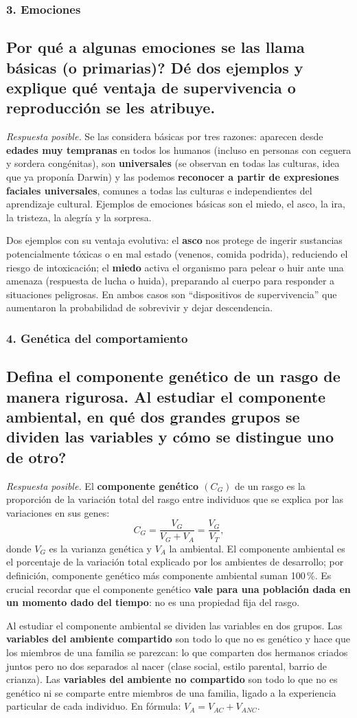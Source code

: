 \documentclass[11pt, a4paper]{article}
\newcommand{\pregunta}[1]{\subsection{#1}}
\newcommand{\eje}[1]{\subsubsection{#1}}
\begin{document}
\eje{3. Emociones}
\pregunta{\textquestiondown Por qu\'e a algunas emociones se las llama \textbf{b\'asicas} (o primarias)? D\'e dos ejemplos y explique qu\'e ventaja de supervivencia o reproducci\'on se les atribuye.}

\begin{respuesta}
\textit{Respuesta posible.} Se las considera b\'asicas por tres razones: aparecen desde \textbf{edades muy tempranas} en todos los humanos (incluso en personas con ceguera y sordera cong\'enitas), son \textbf{universales} (se observan en todas las culturas, idea que ya propon\'ia Darwin) y las podemos \textbf{reconocer a partir de expresiones faciales universales}, comunes a todas las culturas e independientes del aprendizaje cultural. Ejemplos de emociones b\'asicas son el miedo, el asco, la ira, la tristeza, la alegr\'ia y la sorpresa.

Dos ejemplos con su ventaja evolutiva: el \textbf{asco} nos protege de ingerir sustancias potencialmente t\'oxicas o en mal estado (venenos, comida podrida), reduciendo el riesgo de intoxicaci\'on; el \textbf{miedo} activa el organismo para pelear o huir ante una amenaza (respuesta de lucha o huida), preparando al cuerpo para responder a situaciones peligrosas. En ambos casos son ``dispositivos de supervivencia'' que aumentaron la probabilidad de sobrevivir y dejar descendencia.
\end{respuesta}

\eje{4. Gen\'etica del comportamiento}
\pregunta{Defina el \textbf{componente gen\'etico} de un rasgo de manera rigurosa. Al estudiar el componente ambiental, \textquestiondown en qu\'e dos grandes grupos se dividen las variables y c\'omo se distingue uno de otro?}

\begin{respuesta}
\textit{Respuesta posible.} El \textbf{componente gen\'etico $(C_G)$} de un rasgo es la proporci\'on de la variaci\'on total del rasgo entre individuos que se explica por las variaciones en sus genes:
\[
C_G = \frac{V_G}{V_G + V_A} = \frac{V_G}{V_T},
\]
donde $V_G$ es la varianza gen\'etica y $V_A$ la ambiental. El componente ambiental es el porcentaje de la variaci\'on total explicado por los ambientes de desarrollo; por definici\'on, componente gen\'etico m\'as componente ambiental suman 100\,\%. Es crucial recordar que el componente gen\'etico \textbf{vale para una poblaci\'on dada en un momento dado del tiempo}: no es una propiedad fija del rasgo.

Al estudiar el componente ambiental se dividen las variables en dos grupos. Las \textbf{variables del ambiente compartido} son todo lo que no es gen\'etico y hace que los miembros de una familia se parezcan: lo que comparten dos hermanos criados juntos pero no dos separados al nacer (clase social, estilo parental, barrio de crianza). Las \textbf{variables del ambiente no compartido} son todo lo que no es gen\'etico ni se comparte entre miembros de una familia, ligado a la experiencia particular de cada individuo. En f\'ormula: $V_A = V_{AC} + V_{ANC}$.
\end{respuesta}
\end{document}
